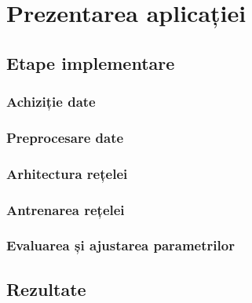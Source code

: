 \chapter{Prezentarea aplicației}\label{ch:3implementare}
\section{Etape implementare}

\subsection{Achiziție date}

\subsection{Preprocesare date}

\subsection{Arhitectura rețelei}

\subsection{Antrenarea rețelei}

\subsection{Evaluarea și ajustarea parametrilor}

\section{Rezultate}
